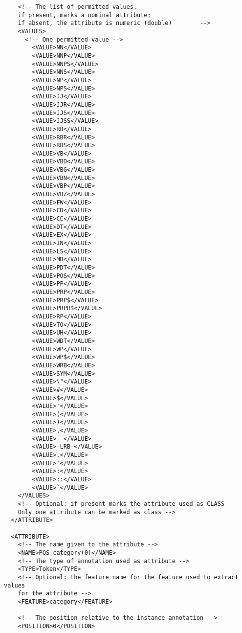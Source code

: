 \begin{verbatim}
    <!-- The list of permitted values.
    if present, marks a nominal attribute;
    if absent, the attribute is numeric (double)        -->
    <VALUES>
      <!-- One permitted value -->
        <VALUE>NN</VALUE>
        <VALUE>NNP</VALUE>
        <VALUE>NNPS</VALUE>
        <VALUE>NNS</VALUE>
        <VALUE>NP</VALUE>
        <VALUE>NPS</VALUE>
        <VALUE>JJ</VALUE>
        <VALUE>JJR</VALUE>
        <VALUE>JJS</VALUE>
        <VALUE>JJSS</VALUE>
        <VALUE>RB</VALUE>
        <VALUE>RBR</VALUE>
        <VALUE>RBS</VALUE>
        <VALUE>VB</VALUE>
        <VALUE>VBD</VALUE>
        <VALUE>VBG</VALUE>
        <VALUE>VBN</VALUE>
        <VALUE>VBP</VALUE>
        <VALUE>VBZ</VALUE>
        <VALUE>FW</VALUE>
        <VALUE>CD</VALUE>
        <VALUE>CC</VALUE>
        <VALUE>DT</VALUE>
        <VALUE>EX</VALUE>
        <VALUE>IN</VALUE>
        <VALUE>LS</VALUE>
        <VALUE>MD</VALUE>
        <VALUE>PDT</VALUE>
        <VALUE>POS</VALUE>
        <VALUE>PP</VALUE>
        <VALUE>PRP</VALUE>
        <VALUE>PRP$</VALUE>
        <VALUE>PRPR$</VALUE>
        <VALUE>RP</VALUE>
        <VALUE>TO</VALUE>
        <VALUE>UH</VALUE>
        <VALUE>WDT</VALUE>
        <VALUE>WP</VALUE>
        <VALUE>WP$</VALUE>
        <VALUE>WRB</VALUE>
        <VALUE>SYM</VALUE>
        <VALUE>\"</VALUE>
        <VALUE>#</VALUE>
        <VALUE>$</VALUE>
        <VALUE>'</VALUE>
        <VALUE>(</VALUE>
        <VALUE>)</VALUE>
        <VALUE>,</VALUE>
        <VALUE>--</VALUE>
        <VALUE>-LRB-</VALUE>
        <VALUE>.</VALUE>
        <VALUE>'</VALUE>
        <VALUE>:</VALUE>
        <VALUE>::</VALUE>
        <VALUE>`</VALUE>
    </VALUES>
    <!-- Optional: if present marks the attribute used as CLASS
    Only one attribute can be marked as class -->
  </ATTRIBUTE>

  <ATTRIBUTE>
    <!-- The name given to the attribute -->
    <NAME>POS_category(0)</NAME>
    <!-- The type of annotation used as attribute -->
    <TYPE>Token</TYPE>
    <!-- Optional: the feature name for the feature used to extract values
    for the attribute -->
    <FEATURE>category</FEATURE>

    <!-- The position relative to the instance annotation -->
    <POSITION>0</POSITION>


\end{verbatim}
